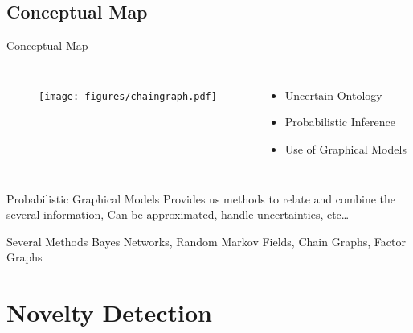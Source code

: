 \documentclass[compress]{beamer}
\begin{document}
\subsection{Conceptual Map}
\begin{frame}{Conceptual Map}
  \begin{columns}[c]
    \begin{figure}
      \texttt{[image: figures/chaingraph.pdf]}
    \end{figure}
    \begin{itemize}
      \item Uncertain Ontology
      \item Probabilistic Inference
      \item Use of Graphical Models
    \end{itemize}
  \end{columns}

\end{frame}

\begin{frame}{Probabilistic Graphical Models}
Provides us methods to relate and combine the several information,
Can be approximated, handle uncertainties, etc\dots

\begin{block}{Several Methods}
Bayes Networks, Random Markov Fields, Chain Graphs, Factor Graphs
\end{block}

\end{frame}


\section{Novelty Detection}
\end{document}
